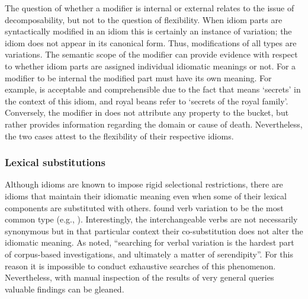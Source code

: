 \documentclass[output=paper]{langsci/langscibook}
\begin{document}
\eal
\zl

The question of whether a modifier is internal or external relates to the issue of decomposability, but not to the question of flexibility. When idiom parts are syntactically modified in an idiom this is certainly an instance of variation; the idiom does not appear in its canonical form. Thus, modifications of all types are variations. The semantic scope of the modifier can provide evidence with respect to whether idiom parts are assigned individual idiomatic meanings or not. For a modifier to be internal the modified part must have its own meaning. For example,  is acceptable and comprehensible due to the fact that  means `secrets' in the context of this idiom, and royal beans refer to `secrets of the royal family'. Conversely, the modifier in  does not attribute any property to the bucket, but rather provides information regarding the domain or cause of death. Nevertheless, the two cases attest to the flexibility of their respective idioms.


\subsubsection{Lexical substitutions}

Although idioms are known to impose rigid selectional restrictions, there are idioms that maintain their idiomatic meaning even when some of their lexical components are substituted with others. \citet{moon98} found verb variation to be the most
common type (e.g., ). Interestingly, the interchangeable verbs are not necessarily synonymous but in that particular context their co-substitution does not alter the idiomatic meaning. As \citet[p. 50]{moon98} noted, ``searching for verbal variation is the hardest part of corpus-based investigations, and ultimately a matter of serendipity''. For this reason it is impossible to conduct exhaustive searches of this phenomenon. Nevertheless, with manual inspection of the results of very general queries valuable findings can be gleaned.
\end{document}
